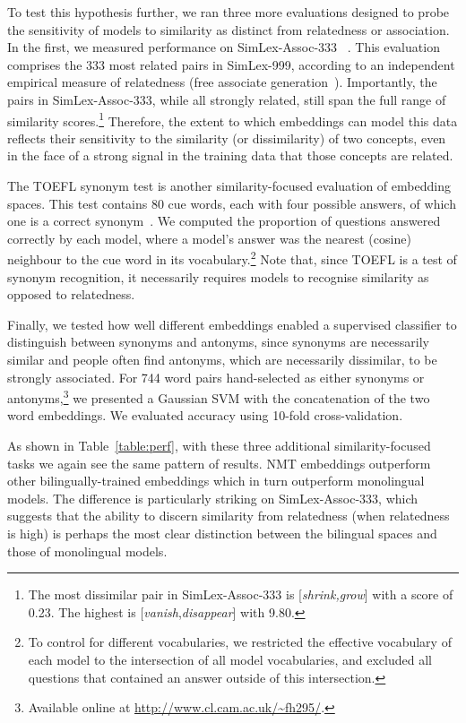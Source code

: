 \documentclass{article} %
\begin{document}
To test this hypothesis further, we ran three more evaluations designed to probe the sensitivity of models to similarity as distinct from relatedness or association. In the first, we measured performance on SimLex-Assoc-333 ~\citep{hill2014simlex}. This evaluation comprises the 333 most related pairs in SimLex-999, according to an independent empirical measure of relatedness (free associate generation~\citep{nelson2004university}). Importantly, the pairs in SimLex-Assoc-333, while all strongly related, still span the full range of similarity scores.\footnote{The most dissimilar pair in SimLex-Assoc-333 is [\emph{shrink,grow}] with a score of 0.23. The highest is [\emph{vanish},\emph{disappear}] with 9.80.} Therefore, the extent to which embeddings can model this data reflects their sensitivity to the similarity (or dissimilarity) of two concepts, even in the face of a strong signal in the training data that those concepts are related.    

The TOEFL synonym test is another similarity-focused evaluation of embedding spaces. This test contains 80 cue words, each with four possible answers, of which one is a correct synonym~\citep{landauer1997solution}. We computed the proportion of questions answered correctly by each model, where a model's answer was the nearest (cosine) neighbour to the cue word in its vocabulary.\footnote{To control for different vocabularies, we restricted the effective vocabulary of each model to the intersection of all model vocabularies, and excluded all questions that contained an answer outside of this intersection.} Note that, since TOEFL is a test of synonym recognition, it necessarily requires models to recognise similarity as opposed to relatedness.  

Finally, we tested how well different embeddings enabled a supervised classifier to distinguish between synonyms and antonyms, since synonyms are necessarily similar and people often find antonyms, which are necessarily dissimilar, to be strongly associated. For 744 word pairs hand-selected as either synonyms or antonyms,\footnote{Available online at \url{http://www.cl.cam.ac.uk/~fh295/}.} we presented a Gaussian SVM with the concatenation of the two word embeddings. We evaluated accuracy using 10-fold cross-validation. 

As shown in Table~\ref{table:perf}, with these three additional similarity-focused tasks we again see the same pattern of results. NMT embeddings outperform other bilingually-trained embeddings which in turn outperform monolingual models. The difference is particularly striking on SimLex-Assoc-333, which suggests that the ability to discern similarity from relatedness (when relatedness is high) is perhaps the most clear distinction between the bilingual spaces and those of monolingual models. 
\end{document}
